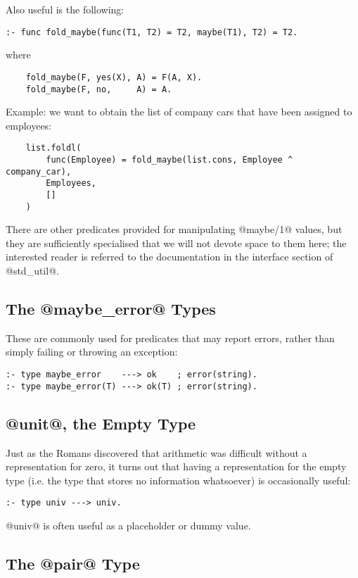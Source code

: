 Also useful is the following:
\begin{verbatim}
:- func fold_maybe(func(T1, T2) = T2, maybe(T1), T2) = T2.
\end{verbatim}
where
\begin{verbatim}
    fold_maybe(F, yes(X), A) = F(A, X).
    fold_maybe(F, no,     A) = A.
\end{verbatim}
Example: we want to obtain the list of company cars that have been
assigned to employees:
\begin{verbatim}
    list.foldl(
        func(Employee) = fold_maybe(list.cons, Employee ^ company_car),
        Employees,
        []
    )
\end{verbatim}

There are other predicates provided for manipulating @maybe/1@ values,
but they are sufficiently specialised that we will not devote space to
them here; the interested reader is referred to the documentation in the
interface section of @std\_util@.

\subsection{The @maybe_error@ Types}

These are commonly used for predicates that may report errors, rather
than simply failing or throwing an exception:
\begin{verbatim}
:- type maybe_error    ---> ok    ; error(string).
:- type maybe_error(T) ---> ok(T) ; error(string).
\end{verbatim}

\subsection{@unit@, the Empty Type}

Just as the Romans discovered that arithmetic was difficult without a
representation for zero, it turns out that having a representation for
the empty type (i.e. the type that stores no information whatsoever) is
occasionally useful:
\begin{verbatim}
:- type univ ---> univ.
\end{verbatim}
@univ@ is often useful as a placeholder or dummy value.

\subsection{The @pair@ Type}

